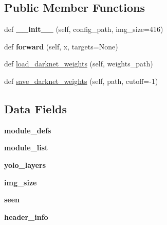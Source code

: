 \subsection*{Public Member Functions}
\begin{DoxyCompactItemize}
\item 
\mbox{\label{classmodels_1_1Darknet_ae26880b84aa1148ff3946431b59c7672}} 
def {\bfseries \+\_\+\+\_\+init\+\_\+\+\_\+} (self, config\+\_\+path, img\+\_\+size=416)
\item 
\mbox{\label{classmodels_1_1Darknet_aa92eddf47d950bd4503b7b680809b486}} 
def {\bfseries forward} (self, x, targets=None)
\item 
def \hyperlink{classmodels_1_1Darknet_a04eb7191a6449fa1971d2fc48f6fa2c2}{load\+\_\+darknet\+\_\+weights} (self, weights\+\_\+path)
\item 
def \hyperlink{classmodels_1_1Darknet_a791dbab6aec1d5d4991c0f387f3f0336}{save\+\_\+darknet\+\_\+weights} (self, path, cutoff=-\/1)
\end{DoxyCompactItemize}
\subsection*{Data Fields}
\begin{DoxyCompactItemize}
\item 
\mbox{\label{classmodels_1_1Darknet_a13c766eedd8eff4515a70c047f53eaa3}} 
{\bfseries module\+\_\+defs}
\item 
\mbox{\label{classmodels_1_1Darknet_a30799d777df35171bc5330e1f472c7c1}} 
{\bfseries module\+\_\+list}
\item 
\mbox{\label{classmodels_1_1Darknet_acce7eb472bec217bbcee9803ca8d0118}} 
{\bfseries yolo\+\_\+layers}
\item 
\mbox{\label{classmodels_1_1Darknet_a106eebb35c2eb761ea01b78e8247718a}} 
{\bfseries img\+\_\+size}
\item 
\mbox{\label{classmodels_1_1Darknet_a4aa890f56acc55a849c93ae90182e693}} 
{\bfseries seen}
\item 
\mbox{\label{classmodels_1_1Darknet_a7807c05863eb1bbd7c752ee9cc753dd7}} 
{\bfseries header\+\_\+info}
\end{DoxyCompactItemize}


